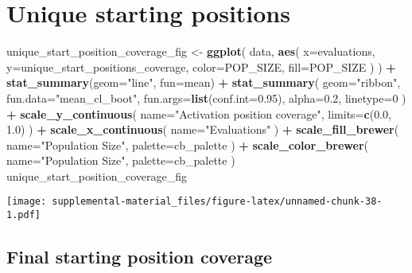 \documentclass[]{book}
\newenvironment{Shaded}{\begin{snugshade}}{\end{snugshade}}
\newcommand{\DataTypeTok}[1]{\textcolor[rgb]{0.13,0.29,0.53}{#1}}
\newcommand{\DecValTok}[1]{\textcolor[rgb]{0.00,0.00,0.81}{#1}}
\newcommand{\FloatTok}[1]{\textcolor[rgb]{0.00,0.00,0.81}{#1}}
\newcommand{\KeywordTok}[1]{\textcolor[rgb]{0.13,0.29,0.53}{\textbf{#1}}}
\newcommand{\NormalTok}[1]{#1}
\newcommand{\OperatorTok}[1]{\textcolor[rgb]{0.81,0.36,0.00}{\textbf{#1}}}
\newcommand{\StringTok}[1]{\textcolor[rgb]{0.31,0.60,0.02}{#1}}
\begin{document}
\hypertarget{unique-starting-positions-2}{%
\section{Unique starting positions}\label{unique-starting-positions-2}}

\begin{Shaded}
\begin{Highlighting}[]
\NormalTok{unique_start_position_coverage_fig <-}\StringTok{ }\KeywordTok{ggplot}\NormalTok{(}
\NormalTok{    data,}
    \KeywordTok{aes}\NormalTok{(}
      \DataTypeTok{x=}\NormalTok{evaluations,}
      \DataTypeTok{y=}\NormalTok{unique_start_positions_coverage,}
      \DataTypeTok{color=}\NormalTok{POP_SIZE,}
      \DataTypeTok{fill=}\NormalTok{POP_SIZE}
\NormalTok{    )}
\NormalTok{  ) }\OperatorTok{+}
\StringTok{  }\KeywordTok{stat_summary}\NormalTok{(}\DataTypeTok{geom=}\StringTok{"line"}\NormalTok{, }\DataTypeTok{fun=}\NormalTok{mean) }\OperatorTok{+}
\StringTok{  }\KeywordTok{stat_summary}\NormalTok{(}
    \DataTypeTok{geom=}\StringTok{"ribbon"}\NormalTok{,}
    \DataTypeTok{fun.data=}\StringTok{"mean_cl_boot"}\NormalTok{,}
    \DataTypeTok{fun.args=}\KeywordTok{list}\NormalTok{(}\DataTypeTok{conf.int=}\FloatTok{0.95}\NormalTok{),}
    \DataTypeTok{alpha=}\FloatTok{0.2}\NormalTok{,}
    \DataTypeTok{linetype=}\DecValTok{0}
\NormalTok{  ) }\OperatorTok{+}
\StringTok{  }\KeywordTok{scale_y_continuous}\NormalTok{(}
    \DataTypeTok{name=}\StringTok{"Activation position coverage"}\NormalTok{,}
    \DataTypeTok{limits=}\KeywordTok{c}\NormalTok{(}\FloatTok{0.0}\NormalTok{, }\FloatTok{1.0}\NormalTok{)}
\NormalTok{  ) }\OperatorTok{+}
\StringTok{  }\KeywordTok{scale_x_continuous}\NormalTok{(}
    \DataTypeTok{name=}\StringTok{"Evaluations"}
\NormalTok{  ) }\OperatorTok{+}
\StringTok{  }\KeywordTok{scale_fill_brewer}\NormalTok{(}
    \DataTypeTok{name=}\StringTok{"Population Size"}\NormalTok{,}
    \DataTypeTok{palette=}\NormalTok{cb_palette}
\NormalTok{  ) }\OperatorTok{+}
\StringTok{  }\KeywordTok{scale_color_brewer}\NormalTok{(}
    \DataTypeTok{name=}\StringTok{"Population Size"}\NormalTok{,}
    \DataTypeTok{palette=}\NormalTok{cb_palette}
\NormalTok{  )}
\NormalTok{unique_start_position_coverage_fig}
\end{Highlighting}
\end{Shaded}

\texttt{[image: supplemental-material\_files/figure-latex/unnamed-chunk-38-1.pdf]}

\hypertarget{final-starting-position-coverage-2}{%
\subsection{Final starting position coverage}\label{final-starting-position-coverage-2}}
\end{document}
